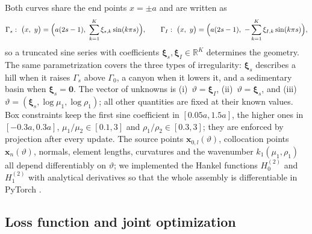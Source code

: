 \documentclass[11pt,twoside]{article}
\begin{document}
Both curves share the end points $x=\pm a$ and are written as
\begin{equation}\label{eq:shape}
  \Gamma_s:\ \bigl(x,\ y\bigr) = \Bigl(a(2s-1),\ \sum_{k=1}^{K}\xi_{s,k}\sin(k\pi s)\Bigr),
  \qquad
  \Gamma_I:\ \bigl(x,\ y\bigr) = \Bigl(a(2s-1),\ -\sum_{k=1}^{K}\xi_{I,k}\sin(k\pi s)\Bigr),
\end{equation}
so a truncated sine series with coefficients $\boldsymbol{\xi}_s,\boldsymbol{\xi}_I\in\mathbb{R}^K$ determines the geometry. The same parametrization covers the three types of irregularity: $\boldsymbol{\xi}_s$ describes a hill when it raises $\Gamma_s$ above $\Gamma_0$, a canyon when it lowers it, and a sedimentary basin when $\boldsymbol{\xi}_s=\mathbf{0}$. The vector of unknowns is (i)~$\vartheta = \boldsymbol{\xi}_I$, (ii)~$\vartheta = \boldsymbol{\xi}_s$, and (iii)~$\vartheta = (\boldsymbol{\xi}_s,\log\mu_1,\log\rho_1)$; all other quantities are fixed at their known values. Box constraints keep the first sine coefficient in $[0.05a, 1.5a]$, the higher ones in $[-0.3a, 0.3a]$, $\mu_1/\mu_2\in[0.1,3]$ and $\rho_1/\rho_2\in[0.3,3]$; they are enforced by projection after every update. The source points $\mathbf{x}_{0,l}(\vartheta)$, collocation points $\mathbf{x}_n(\vartheta)$, normals, element lengths, curvatures and the wavenumber $k_1(\mu_1,\rho_1)$ all depend differentiably on $\vartheta$; we implemented the Hankel functions $H_0^{(2)}$ and $H_1^{(2)}$ with analytical derivatives so that the whole assembly is differentiable in PyTorch \citep{Paszke2019}.

\subsection{Loss function and joint optimization}
\end{document}
